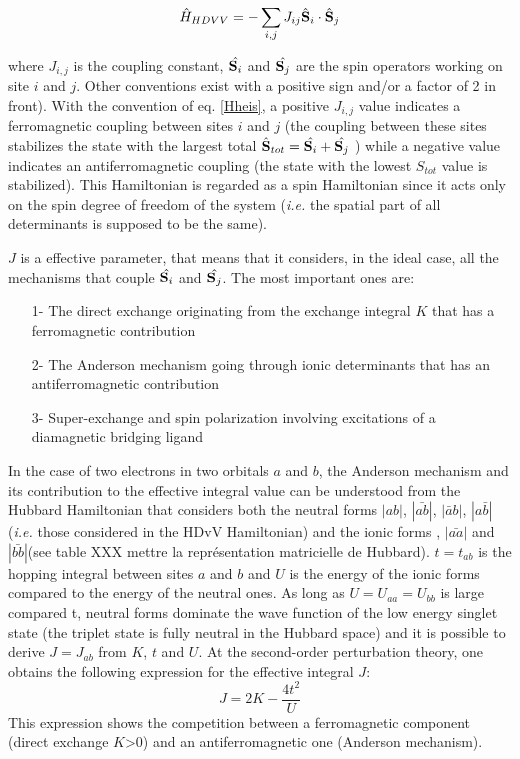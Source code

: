 \documentclass[12pt]{report}
\numberwithin{equation}{section}
\begin{document}
\begin{equation}\label{Hheis}
    \hat{H}_{HDVV}=-\sum_{i,j} J_{ij} \hat{\vb S}_i \cdot \hat{\vb S}_j
\end{equation}

where $J_{i,j}$ is the coupling constant, $\hat{\vb S_i}$ and $\hat{\vb S_j}$ are the spin operators working on site $i$ and $j$. Other conventions exist with a positive sign and/or a factor of 2 in front).  
With the convention of eq. \ref{Hheis}, a positive $J_{i,j}$ value indicates a ferromagnetic coupling between sites $i$ and $j$ (the coupling between these sites stabilizes the state with the largest total $\hat{\vb S}_{tot}=\hat{\vb S_i}+\hat{\vb S_j}$ ) while a negative value indicates an antiferromagnetic coupling (the state with the lowest $S_{tot}$ value is stabilized).
This Hamiltonian is regarded as a spin Hamiltonian since it acts only on the spin degree of freedom of the system (\textit{i.e.} the spatial part of all determinants is supposed to be the same).

$J$  is a effective parameter, that means that it considers, in the ideal case, all the mechanisms that couple $\hat{\vb S_i}$ and $\hat{\vb S_j}$. The most important ones are:
\begin{itemize}
    \item[1-] The direct exchange originating from the exchange integral $K$ that has a ferromagnetic contribution
    \item[2-] The Anderson mechanism going through ionic determinants that has an antiferromagnetic contribution
    \item[3-] Super-exchange and spin polarization involving excitations of a diamagnetic bridging ligand
\end{itemize}

 In the case of two electrons in two orbitals $a$ and $b$, the Anderson mechanism and its contribution to the effective integral value can be understood from the Hubbard Hamiltonian that considers both the neutral forms $|ab|$, $|\bar{ab}|$, $|\bar{a}b|$, $|a\bar{b}|$ (\textit{i.e.} those considered in the HDvV Hamiltonian) and the ionic forms , $|\bar{aa}|$ and  $|\bar{bb}|$(see table XXX mettre la représentation matricielle de Hubbard).
 $t=t_{ab}$ is the hopping integral between sites $a$ and $b$ and $U$ is the energy of the ionic forms compared to the energy of the neutral ones.
 As long as $U=U_{aa}=U_{bb}$ is large compared t, neutral forms dominate the wave function of the low energy singlet state (the triplet state is fully neutral in the Hubbard space) and it is possible to derive $J=J_{ab}$ from $K$, $t$ and $U$.
 At the second-order perturbation theory, one obtains the following expression for the effective integral $J$:
\begin{equation}
    J=2K-\frac{4t^2}{U}
\end{equation}
This expression shows the competition between a ferromagnetic component (direct exchange $K$>0) and an antiferromagnetic one (Anderson mechanism).
\end{document}
